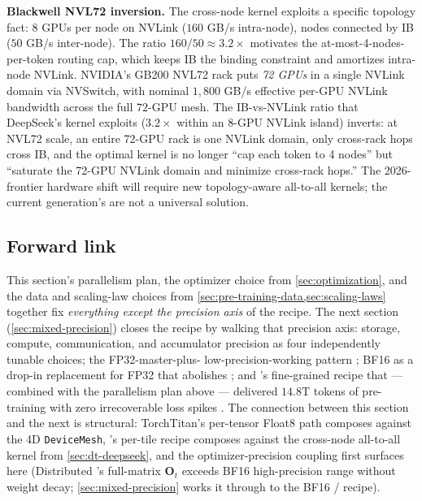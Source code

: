 \begin{contradiction}
\textbf{Blackwell NVL72 inversion.} The  cross-node kernel
\citep[\S 3.2.2]{deepseek-v3} exploits a specific topology fact: 8 GPUs
per node on NVLink ($160$ GB/s intra-node), nodes connected by IB
($50$ GB/s inter-node). The ratio $160/50 \approx 3.2\times$ motivates
the at-most-4-nodes-per-token routing cap, which keeps IB the binding
constraint and amortizes intra-node NVLink. NVIDIA's GB200 NVL72 rack
puts \emph{72 GPUs} in a single NVLink domain via NVSwitch, with
nominal $1{,}800$ GB/s effective per-GPU NVLink bandwidth across the
full $72$-GPU mesh. The IB-vs-NVLink ratio that DeepSeek's kernel
exploits ($3.2\times$ within an 8-GPU NVLink island) inverts: at NVL72
scale, an entire 72-GPU rack is one NVLink domain, only cross-rack
hops cross IB, and the optimal kernel is no longer ``cap each token
to 4 nodes'' but ``saturate the 72-GPU NVLink domain and minimize
cross-rack hops.'' The 2026-frontier hardware shift will require new
topology-aware all-to-all kernels; the current generation's are not a
universal solution. 
\end{contradiction}

\subsection{Forward link}
\label{sec:dt-forward}

This section's parallelism plan, the optimizer choice from
\cref{sec:optimization}, and the data and scaling-law choices from
\cref{sec:pre-training-data,sec:scaling-laws} together fix
\emph{everything except the precision axis} of the recipe. The next
section (\cref{sec:mixed-precision}) closes the recipe by walking
that precision axis: storage, compute, communication, and accumulator
precision as four independently tunable choices; the FP32-master-plus-
low-precision-working pattern \citep[\S 2]{micikevicius2017-mixed-precision};
BF16 as a drop-in replacement for FP32 that abolishes 
\citep{kalamkar2019-bfloat16}; and 's fine-grained 
recipe \citep[\S 3.3]{deepseek-v3} that --- combined with the
parallelism plan above --- delivered $14.8\text{T}$ tokens of pre-
training with zero irrecoverable loss spikes
\citep[abstract]{deepseek-v3}. The connection between this section and
the next is structural: TorchTitan's per-tensor Float8 path
\citep[\S 2.2.4]{torchtitan2024} composes against the 4D
\texttt{DeviceMesh}, 's per-tile  recipe composes
against the cross-node all-to-all kernel from \cref{sec:dt-deepseek},
and the optimizer-precision coupling first surfaces here (Distributed
's full-matrix $\mathbf{O}_t$ exceeds BF16 high-precision range
without weight decay; \cref{sec:mixed-precision} works it through to
the BF16 /  recipe).
